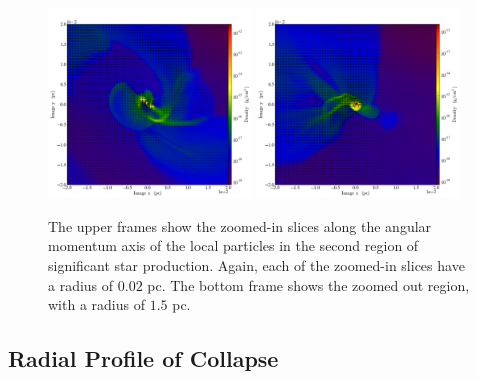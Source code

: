 \documentclass{emulateapj}
\begin{document}
\begin{figure}
\includegraphics[width=0.48\textwidth]{movie_disk_0132_0002.png}
\includegraphics[width=0.48\textwidth]{movie_disk_0132_0004.png}
\caption{The upper frames show the zoomed-in slices along the angular momentum axis of the local particles in the second region of significant star production.  Again, each of the zoomed-in slices have a radius of $0.02$ pc.  The bottom frame shows the zoomed out region, with a radius of $1.5$ pc.  \label{fig:snapshots 2}}
\end{figure}


 


\subsection{Radial Profile of Collapse}
\end{document}
